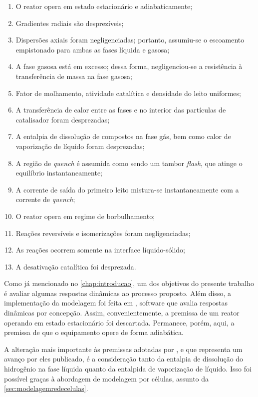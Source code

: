 \begin{enumerate}
  \item O reator opera em estado estacionário e adiabaticamente;
  \item Gradientes radiais são desprezíveis;
  \item Dispersões axiais foram negligenciadas; portanto, assumiu-se o
  escoamento empistonado para ambas as fases líquida e gasosa;
  \item A fase gasosa está em excesso; dessa forma, negligenciou-se a
  resistência à transferência de massa na fase gasosa;
  \item Fator de molhamento, atividade catalítica e densidade do leito
  uniformes;
  \item A transferência de calor entre as fases e no interior das partículas de
  catalisador foram desprezadas;
  \item A entalpia de dissolução de compostos na fase gás, bem como calor de
  vaporização de líquido foram desprezadas;
  \item A região de \emph{quench} é assumida como sendo um tambor \emph{flash},
  que atinge o equilíbrio instantaneamente;
  \item A corrente de saída do primeiro leito mistura-se instantaneamente com a
  corrente de \emph{quench};
  \item O reator opera em regime de borbulhamento;
  \item Reações reversíveis e isomerizações foram negligenciadas;
  \item As reações ocorrem somente na interface líquido-sólido;
  \item A desativação catalítica foi desprezada.
\end{enumerate}

Como já mencionado no \autoref{chap:introducao}, um dos objetivos do presente
trabalho é avaliar algumas respostas dinâmicas ao processo proposto. Além disso,
a implementação da modelagem foi feita em \emso, software que avalia respostas
dinâmicas por concepção. Assim, convenientemente, a premissa de um reator
operando em estado estacionário foi descartada. Permanece, porém, aqui, a
premissa de que o equipamento opere de forma adiabática.

A alteração mais importante às premissas adotadas por , e
que representa um avanço por eles publicado, é a consideração tanto da entalpia
de dissolução do hidrogênio na fase líquida quanto da entalpida de vaporização
de líquido. Isso foi possível graças à abordagem de modelagem por células,
assunto da \autoref{sec:modelagemredecelulas}.

